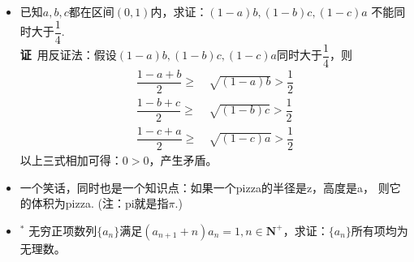 \begin{itemize}[leftmargin=\inteval{\myitemleftmargin}pt,itemsep=
   \inteval{\myitemitempsep}pt,topsep=\inteval{\myitemtopsep}pt]
\item 已知$ a,b,c $都在区间$ (0,1) $内，求证：$ (1-a)b,(1-b)c,(1-c)a $
不能同时大于$ \dfrac{1}{4} $.  \\
\textbf{证}\ 用反证法：假设$ (1-a)b,(1-b)c,(1-c)a $同时大于$ \dfrac{1}{4} $，则
\begin{align*}
    \dfrac{1-a+b}{2} \geq &\ \sqrt{(1-a)b}>\dfrac{1}{2} \\
    \dfrac{1-b+c}{2} \geq &\ \sqrt{(1-b)c}>\dfrac{1}{2} \\
    \dfrac{1-c+a}{2} \geq &\ \sqrt{(1-c)a}>\dfrac{1}{2}      
\end{align*}
以上三式相加可得：$ 0>0 $，产生矛盾。 

\item  一个笑话，同时也是一个知识点：如果一个pizza的半径是z，高度是a，
则它的体积为pizza. (注：pi就是指$ \pi $.)

\item $ ^* $ 无穷正项数列$ \{a_n\} $满足$ (a_{n+1}+n)a_n=1,n\in 
\textbf{N}^+ $，求证：$ \{a_n\} $所有项均为无理数。

\end{itemize}

